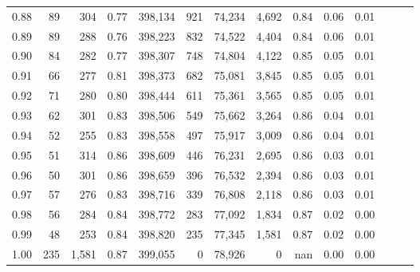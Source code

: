 \begin{tabular}{rrrrrrrrrrrrrr}
0.88 &      89 &    304 &  0.77 &  398,134 &      921 &  74,234 &   4,692 &  0.84 &  0.06 &      0.01 \\
0.89 &      89 &    288 &  0.76 &  398,223 &      832 &  74,522 &   4,404 &  0.84 &  0.06 &      0.01 \\
0.90 &      84 &    282 &  0.77 &  398,307 &      748 &  74,804 &   4,122 &  0.85 &  0.05 &      0.01 \\
0.91 &      66 &    277 &  0.81 &  398,373 &      682 &  75,081 &   3,845 &  0.85 &  0.05 &      0.01 \\
0.92 &      71 &    280 &  0.80 &  398,444 &      611 &  75,361 &   3,565 &  0.85 &  0.05 &      0.01 \\
0.93 &      62 &    301 &  0.83 &  398,506 &      549 &  75,662 &   3,264 &  0.86 &  0.04 &      0.01 \\
0.94 &      52 &    255 &  0.83 &  398,558 &      497 &  75,917 &   3,009 &  0.86 &  0.04 &      0.01 \\
0.95 &      51 &    314 &  0.86 &  398,609 &      446 &  76,231 &   2,695 &  0.86 &  0.03 &      0.01 \\
0.96 &      50 &    301 &  0.86 &  398,659 &      396 &  76,532 &   2,394 &  0.86 &  0.03 &      0.01 \\
0.97 &      57 &    276 &  0.83 &  398,716 &      339 &  76,808 &   2,118 &  0.86 &  0.03 &      0.01 \\
0.98 &      56 &    284 &  0.84 &  398,772 &      283 &  77,092 &   1,834 &  0.87 &  0.02 &      0.00 \\
0.99 &      48 &    253 &  0.84 &  398,820 &      235 &  77,345 &   1,581 &  0.87 &  0.02 &      0.00 \\
1.00 &     235 &  1,581 &  0.87 &  399,055 &        0 &  78,926 &       0 &   nan &  0.00 &      0.00 \\
\bottomrule
\end{tabular}
